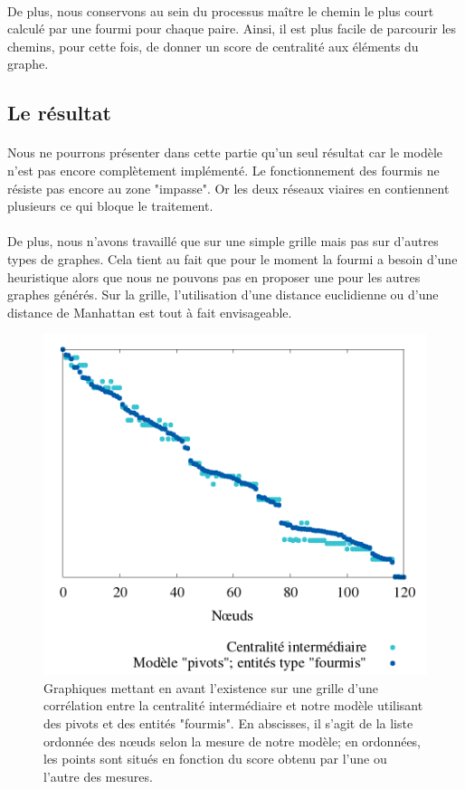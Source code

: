 \documentclass[a4paper, 10pt]{report}
\begin{document}
\paragraph{}De plus, nous conservons au sein du processus maître le chemin le plus court calculé par une fourmi pour chaque paire. Ainsi, il est plus facile de parcourir les chemins, pour cette fois, de donner un score de centralité aux éléments du graphe.
	
		\subsection{Le résultat}
		
\paragraph{}Nous ne pourrons présenter dans cette partie qu'un seul résultat car le modèle n'est pas encore complètement implémenté. Le fonctionnement des fourmis ne résiste pas encore au zone "impasse". Or les deux réseaux viaires en contiennent plusieurs ce qui bloque le traitement. 

\paragraph{}De plus, nous n'avons travaillé que sur une simple grille mais pas sur d'autres types de graphes. Cela tient au fait que pour le moment la fourmi a besoin d'une heuristique alors que nous ne pouvons pas en proposer une pour les autres graphes générés. Sur la grille, l'utilisation d'une distance euclidienne ou d'une distance de Manhattan est tout à fait envisageable.

\begin{figure}[htbp]
	\centering
	\includegraphics[width=0.65\linewidth]{./img/pivots_fourmis_grille_10.png}
	\caption{Graphiques mettant en avant l'existence sur une grille d'une corrélation entre la centralité intermédiaire et notre modèle utilisant des pivots et des entités "fourmis". En abscisses, il s'agit de la liste ordonnée des n\oe uds selon la mesure de notre modèle; en ordonnées, les points sont situés en fonction du score obtenu par l'une ou l'autre des mesures.}
	\label{fig:correlation_centralite_pivots_fourmis}
\end{figure}
	
\end{document}
